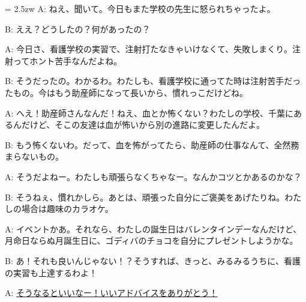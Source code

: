 \documentclass[11pt]{amsart}
\title{}
\author{}
\newenvironment{hangall}[1]{\hangindent = 2.5zw\everypar{\hangindent = 2.5zw}}{}
\begin{document}
\maketitle
\begin{hangall}{}%
A: ねえ、聞いて。今日もまた学校の先生に怒られちゃったよ。

B: ええ？どうしたの？何があったの？

A: 今日さ、看護学校の実習で、注射打たなきゃいけなくて、失敗しまくり。注射ってホント苦手なんだよね。

B: そうだったの。わかるわ。わたしも、看護学校に通ってた時は注射苦手だったもの。今はもう助産師になって長いから、慣れっこだけどね。

A: へえ！助産師さんなんだ！ねえ、血とか怖くない？わたしの学校、千葉にあるんだけど、そこの友達は血が怖いから別の進路に変更したんだよ。

B: もう怖くないわ。だって、血を怖がってたら、助産師の仕事なんて、全然務まらないもの。

A: そうだよねー。わたしも頑張らなくちゃなー。なんかコツとかあるのかな？

B: そうねぇ、慣れかしら。あとは、頑張った自分にご褒美をあげたりね。わたしの場合は趣味のカラオケ。

A: イベントかあ。それなら、わたしの誕生日はバレンタインデーなんだけど、月命日ならぬ月誕生日に、ゴディバのチョコを自分にプレゼントしようかな。

B: あ！それも良いんじゃない！？そうすれば、きっと、みるみるうちに、看護の実習も上達するわよ！

A: \ul{そうなるといいなー！いいアドバイスをありがとう！}\end{hangall}
\end{document}
